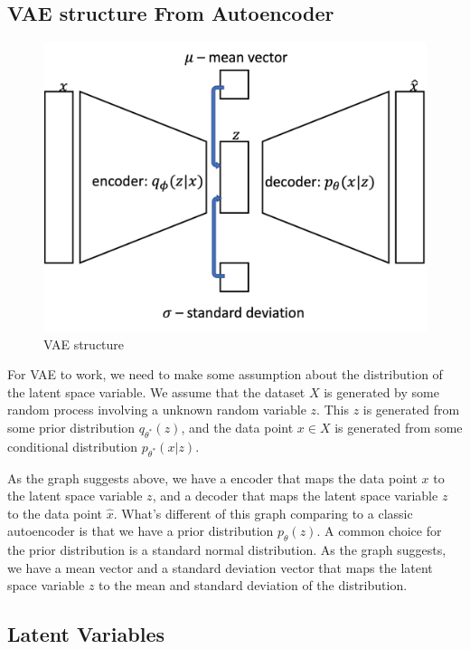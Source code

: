 \documentclass[11pt]{article}
\theoremstyle{definition}
\begin{document}
\subsection{VAE structure From Autoencoder}
\begin{figure}[h]
    \begin{center}
\includegraphics[scale=0.5]{vae-graph.png}
    \end{center}
\caption{VAE structure}
\end{figure}


For VAE to work, we need to make some assumption about the distribution of the latent space variable. We assume that the dataset $X$ is generated by some random process involving a unknown random variable $z$. This $z$ is generated from some prior distribution $q_{\theta^*}(z)$, and the data point $x \in X$ is generated from some conditional distribution $p_{\theta^*}(x|z)$. 

As the graph suggests above, we have a encoder that maps the data point $x$ to the latent space variable $z$, and a decoder that maps the latent space variable $z$ to the data point $\hat{x}$. What's different of this graph comparing to a classic autoencoder is that we have a prior distribution $p_{\theta}(z)$. A common choice for the prior distribution is a standard normal distribution. As the graph suggests, we have a mean vector and a standard deviation vector that maps the latent space variable $z$ to the mean and standard deviation of the distribution.

\subsection{Latent Variables}
\end{document}
